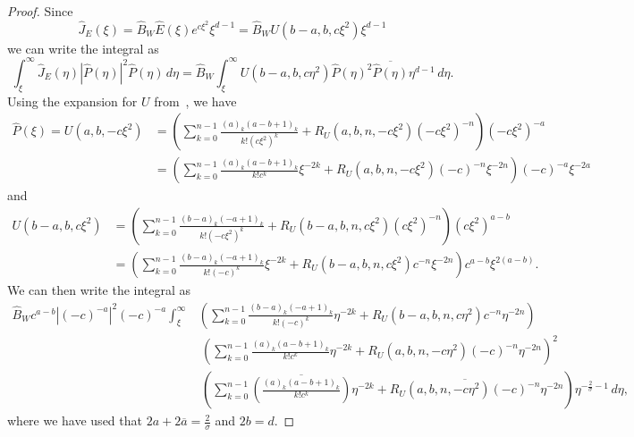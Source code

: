\documentclass[11pt]{article}
\newcommand{\conj}[1]{\overline{#1}}
\begin{document}
\begin{proof}
  Since
  \begin{equation*}
    \hat{J}_{E}(\xi) = \hat{B}_{W}\hat{E}(\xi)e^{c\xi^{2}}\xi^{d - 1}
    = \hat{B}_{W}U(b - a, b, c\xi^{2})\xi^{d - 1}
  \end{equation*}
  we can write the integral as
  \begin{equation*}
    \int_{\xi}^{\infty} \hat{J}_{E}(\eta)|\hat{P}(\eta)|^{2}\hat{P}(\eta)\,d\eta
    = \hat{B}_{W}\int_{\xi}^{\infty} U(b - a, b, c\eta^{2})\hat{P}(\eta)^{2}\conj{\hat{P}(\eta)}\eta^{d - 1}\,d\eta.
  \end{equation*}
  Using the expansion for \(U\) from~\cite[Lemma~7.1]{Dahne2024}, we
  have
  \begin{equation*}
    \begin{split}
      \hat{P}(\xi)
      = U(a, b, -c\xi^{2})
      &= \left(
        \sum_{k = 0}^{n - 1} \frac{(a)_{k}(a - b + 1)_{k}}{k!(c\xi^{2})^{k}}
        + R_{U}(a, b, n, -c\xi^{2})\left(-c\xi^{2}\right)^{-n}
        \right)\left(-c\xi^{2}\right)^{-a}\\
      &= \left(
        \sum_{k = 0}^{n - 1} \frac{(a)_{k}(a - b + 1)_{k}}{k!c^{k}}\xi^{-2k}
        + R_{U}(a, b, n, -c\xi^{2})(-c)^{-n}\xi^{-2n}
        \right)(-c)^{-a}\xi^{-2a}
    \end{split}
  \end{equation*}
  and
  \begin{equation*}
    \begin{split}
      U(b - a, b, c\xi^{2})
      &= \left(
        \sum_{k = 0}^{n - 1} \frac{(b - a)_{k}(-a + 1)_{k}}{k!(-c\xi^{2})^{k}}
        + R_{U}(b - a, b, n, c\xi^{2})\left(c\xi^{2}\right)^{-n}
        \right)\left(c\xi^{2}\right)^{a - b}\\
      &= \left(
        \sum_{k = 0}^{n - 1} \frac{(b - a)_{k}(-a + 1)_{k}}{k!(-c)^{k}}\xi^{-2k}
        + R_{U}(b - a, b, n, c\xi^{2})c^{-n}\xi^{-2n}
        \right)c^{a - b}\xi^{2(a - b)}.
    \end{split}
  \end{equation*}
  We can then write the integral as
  \begin{equation*}
    \begin{split}
      \hat{B}_{W}c^{a - b}|(-c)^{-a}|^{2}(-c)^{-a}\int_{\xi}^{\infty}
      &\left(
        \sum_{k = 0}^{n - 1} \frac{(b - a)_{k}(-a + 1)_{k}}{k!(-c)^{k}}\eta^{-2k}
        + R_{U}(b - a, b, n, c\eta^{2})c^{-n}\eta^{-2n}
        \right)\\
      &\ \left(
        \sum_{k = 0}^{n - 1} \frac{(a)_{k}(a - b + 1)_{k}}{k!c^{k}}\eta^{-2k}
        + R_{U}(a, b, n, -c\eta^{2})(-c)^{-n}\eta^{-2n}
        \right)^{2}\\
      &\ \left(
        \sum_{k = 0}^{n - 1} \conj{\left(\frac{(a)_{k}(a - b + 1)_{k}}{k!c^{k}}\right)}\eta^{-2k}
        + \conj{R_{U}(a, b, n, -c\eta^{2})(-c)^{-n}}\eta^{-2n}
        \right)\eta^{-\frac{2}{\sigma} - 1}\,d\eta,
    \end{split}
  \end{equation*}
  where we have used that \(2a + 2\conj{a} = \frac{2}{\sigma}\)
  and \(2b = d\).
\end{proof}
\end{document}
